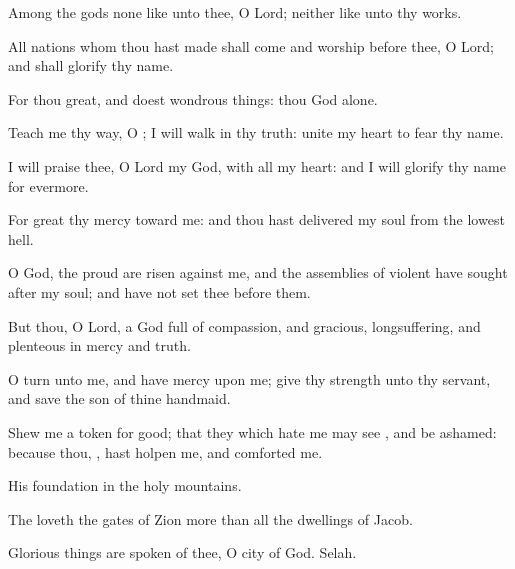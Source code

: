 {\Q {}Among the
gods
{} none like unto thee, O
Lord; neither
{} like unto thy
works.


\par }{\Q {}All
nations whom thou hast
made shall
come and
worship
before thee, O
Lord; and shall
glorify thy
name.


\par }{\Q {}For thou
{}
great, and
doest wondrous
things: thou
{}
God alone.


\par }{\Q {}Teach me thy
way, O
{}; I will
walk in thy
truth:
unite my
heart to
fear thy
name.


\par }{\Q {}I will
praise thee, O
Lord my
God, with all my
heart: and I will
glorify thy
name for
evermore.


\par }{\Q {}For
great
{} thy
mercy toward me: and thou hast
delivered my
soul from the
lowest
hell.


\par }{\Q {}O
God, the
proud are
risen against me, and the
assemblies of
violent
{} have
sought after my
soul; and have not
set thee before them.


\par }{\Q {}But thou, O
Lord,
{} a
God full of
compassion, and
gracious,
longsuffering, and
plenteous in
mercy and
truth.


\par }{\Q {}O
turn unto me, and have
mercy upon me;
give thy
strength unto thy
servant, and
save the
son of thine
handmaid.


\par }{\Q {}Shew me a
token for
good; that they which
hate me may
see
{}, and be
ashamed: because thou,
{}, hast
holpen me, and
comforted me.




\par }
{\Q {}His
foundation
{} in the
holy
mountains.


\par }{\Q {}The
{}
loveth the
gates of
Zion more than all the
dwellings of
Jacob.


\par }{\Q {}Glorious
things are
spoken of thee, O
city of
God.
Selah.


\par }{\BB \par }
